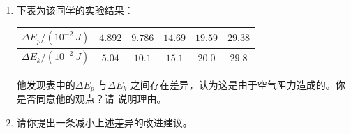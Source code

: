 \begin{enumerate}
\begin{enumerate}
\item 
下表为该同学的实验结果：
\begin{table}[h!]
\centering 
\begin{tabular}{|c|c|c|c|c|c|}
\hline 
$ \Delta E_{p} /(10^{-2} \ J) $ & $ 4.892 $ & $ 9.786 $ & $ 14.69 $ & $ 19.59 $ & $ 29.38 $
 \\
\hline
$ \Delta E_{k} /(10^{-2} \ J) $ & $ 5.04 $ & $ 10.1 $ & $ 15.1 $ & $ 20.0 $ & $ 29.8 $\\ 
\hline 
\end{tabular}
\end{table} 


他发现表中的$ \Delta E_{p} $ 与$ \Delta E_{k} $ 之间存在差异，认为这是由于空气阻力造成的。你是否同意他的观点？请
说明理由。


\item 
请你提出一条减小上述差异的改进建议。


\end{enumerate}







\end{enumerate}

